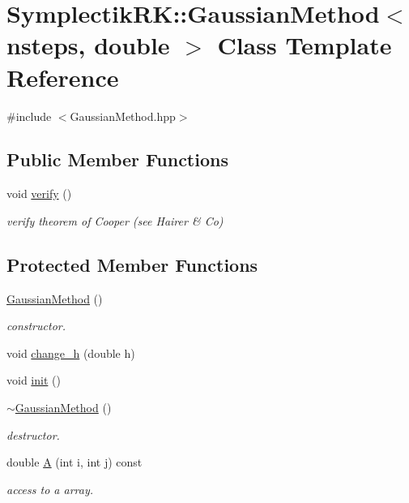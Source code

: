 \hypertarget{classSymplectikRK_1_1GaussianMethod_3_01nsteps_00_01double_01_4}{\section{Symplectik\-R\-K\-:\-:Gaussian\-Method$<$ nsteps, double $>$ Class Template Reference}
\label{classSymplectikRK_1_1GaussianMethod_3_01nsteps_00_01double_01_4}
}


{\ttfamily \#include $<$Gaussian\-Method.\-hpp$>$}

\subsection*{Public Member Functions}
\begin{DoxyCompactItemize}
\item 
void \hyperlink{classSymplectikRK_1_1GaussianMethod_3_01nsteps_00_01double_01_4_a59b54540a5e3f52b63833f331a411440}{verify} ()
\begin{DoxyCompactList}\small\item\em verify theorem of Cooper (see Hairer \& Co) \end{DoxyCompactList}\end{DoxyCompactItemize}
\subsection*{Protected Member Functions}
\begin{DoxyCompactItemize}
\item 
\hyperlink{classSymplectikRK_1_1GaussianMethod_3_01nsteps_00_01double_01_4_aebe7a1382213853b3dfb1fd5d453ea94}{Gaussian\-Method} ()
\begin{DoxyCompactList}\small\item\em constructor. \end{DoxyCompactList}\item 
void \hyperlink{classSymplectikRK_1_1GaussianMethod_3_01nsteps_00_01double_01_4_abd6fa521e9fc484ff0323ff10887cfdb}{change\-\_\-h} (double h)
\item 
void \hyperlink{classSymplectikRK_1_1GaussianMethod_3_01nsteps_00_01double_01_4_a4bffac49090408e16ee1bb7d81e2ce46}{init} ()
\item 
\hyperlink{classSymplectikRK_1_1GaussianMethod_3_01nsteps_00_01double_01_4_a2c751ea1976c930daf2280c454b06963}{$\sim$\-Gaussian\-Method} ()
\begin{DoxyCompactList}\small\item\em destructor. \end{DoxyCompactList}\item 
double \hyperlink{classSymplectikRK_1_1GaussianMethod_3_01nsteps_00_01double_01_4_a3d8296beb68d32eb787da5bc2f630b81}{A} (int i, int j) const 
\begin{DoxyCompactList}\small\item\em access to a array. \end{DoxyCompactList}\end{DoxyCompactItemize}

